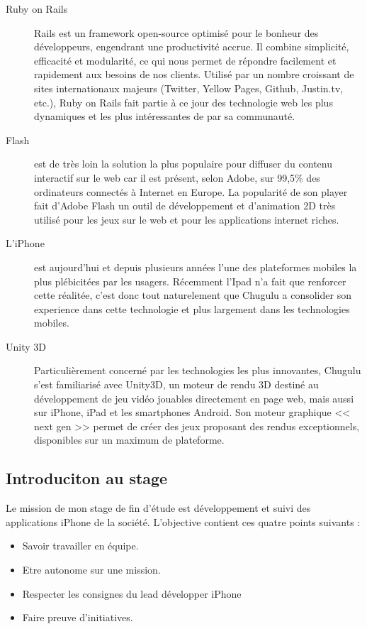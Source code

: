 \begin{description}
	\item[Ruby on Rails] Rails est un framework open-source optimisé pour le bonheur des développeurs, engendrant une productivité accrue. Il combine simplicité, efficacité et modularité, ce qui nous permet de répondre facilement et rapidement aux besoins de nos clients. Utilisé par un nombre croissant de sites internationaux majeurs (Twitter, Yellow Pages, Github, Justin.tv, etc.), Ruby on Rails fait partie à ce jour des technologie web les plus dynamiques et les plus intéressantes de par sa communauté.
	\item[Flash] est de très loin la solution la plus populaire pour diffuser du contenu interactif sur le web car il est présent, selon Adobe, sur 99,5\% des ordinateurs connectés à Internet en Europe. La popularité de son player fait d’Adobe Flash un outil de développement et d’animation 2D très utilisé pour les jeux sur le web et pour les applications internet riches.
	\item[L'iPhone] est aujourd'hui et depuis plusieurs années l'une des plateformes mobiles la plus plébicitées par les usagers. Récemment l'Ipad n'a fait que renforcer cette réalitée, c'est donc tout naturelement que Chugulu a consolider son experience dans cette technologie et plus largement dans les technologies mobiles.
	\item[Unity 3D] Particulièrement concerné par les technologies les plus innovantes, Chugulu s’est familiarisé avec Unity3D, un moteur de rendu 3D destiné au développement de jeu vidéo jouables directement en page web, mais aussi sur iPhone, iPad et les smartphones Android. Son moteur graphique << next gen >> permet de créer des jeux proposant des rendus exceptionnels, disponibles sur un maximum de plateforme.
\end{description}



\subsection{Introduciton au stage} %
Le mission de mon stage de fin d'étude est développement et suivi des applications iPhone de la société. L'objective contient ces quatre points suivants : 

\begin{itemize}
	\item Savoir travailler en équipe.
	\item Etre autonome sur une mission.
	\item Respecter les consignes du lead développer iPhone
	\item Faire preuve d'initiatives.
\end{itemize}

